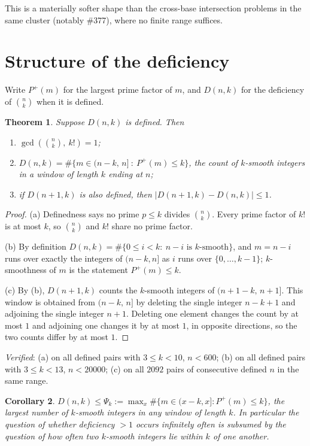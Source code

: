 \documentclass[11pt]{article}
\newtheorem{theorem}{Theorem}
\newtheorem{corollary}[theorem]{Corollary}
\begin{document}
This is a materially softer shape than the cross-base intersection problems in the same
cluster (notably \#377), where no finite range suffices.

\section{Structure of the deficiency}

Write $P^{+}(m)$ for the largest prime factor of $m$, and $D(n,k)$ for the deficiency of
$\binom nk$ when it is defined.

\begin{theorem}\label{thm:struct}
Suppose $D(n,k)$ is defined.  Then
\begin{enumerate}
\item[\textup{(a)}] $\gcd\!\left(\binom nk,\ k!\right)=1$;
\item[\textup{(b)}] $D(n,k)=\#\bigl\{m\in(n-k,\,n]\ :\ P^{+}(m)\le k\bigr\}$, the count of
$k$-smooth integers in a window of length $k$ ending at $n$;
\item[\textup{(c)}] if $D(n+1,k)$ is also defined, then $\bigl|D(n+1,k)-D(n,k)\bigr|\le1$.
\end{enumerate}
\end{theorem}

\begin{proof}
(a) Definedness says no prime $p\le k$ divides $\binom nk$.  Every prime factor of $k!$ is
at most $k$, so $\binom nk$ and $k!$ share no prime factor.

(b) By definition $D(n,k)=\#\{0\le i<k:\ n-i \text{ is }k\text{-smooth}\}$, and
$m=n-i$ runs over exactly the integers of $(n-k,n]$ as $i$ runs over $\{0,\dots,k-1\}$;
$k$-smoothness of $m$ is the statement $P^{+}(m)\le k$.

(c) By (b), $D(n+1,k)$ counts the $k$-smooth integers of $(n+1-k,\,n+1]$.  This window is
obtained from $(n-k,\,n]$ by deleting the single integer $n-k+1$ and adjoining the single
integer $n+1$.  Deleting one element changes the count by at most $1$ and adjoining one
changes it by at most $1$, in opposite directions, so the two counts differ by at most $1$.
\end{proof}

\emph{Verified}: (a) on all defined pairs with $3\le k<10$, $n<600$; (b) on all defined
pairs with $3\le k<13$, $n<20000$; (c) on all $2092$ pairs of consecutive defined $n$ in the
same range.

\begin{corollary}\label{cor:window}
$D(n,k)\le\Psi_k:=\max_{x}\#\{m\in(x-k,x]:P^{+}(m)\le k\}$, the largest number of
$k$-smooth integers in any window of length $k$.  In particular the question of whether
deficiency $>1$ occurs infinitely often is subsumed by the question of how often two
$k$-smooth integers lie within $k$ of one another.
\end{corollary}
\end{document}
